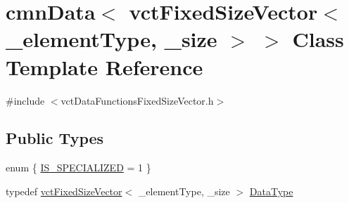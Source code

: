 \hypertarget{classcmn_data_3_01vct_fixed_size_vector_3_01__element_type_00_01__size_01_4_01_4}{}\section{cmn\+Data$<$ vct\+Fixed\+Size\+Vector$<$ \+\_\+element\+Type, \+\_\+size $>$ $>$ Class Template Reference}
\label{classcmn_data_3_01vct_fixed_size_vector_3_01__element_type_00_01__size_01_4_01_4}


{\ttfamily \#include $<$vct\+Data\+Functions\+Fixed\+Size\+Vector.\+h$>$}

\subsection*{Public Types}
\begin{DoxyCompactItemize}
\item 
enum \{ \hyperlink{classcmn_data_3_01vct_fixed_size_vector_3_01__element_type_00_01__size_01_4_01_4_a3cc02489a14a62b167209c4161b694a5aa91408e94959b83b507757e31a2b1958}{I\+S\+\_\+\+S\+P\+E\+C\+I\+A\+L\+I\+Z\+E\+D} = 1
 \}
\item 
typedef \hyperlink{classvct_fixed_size_vector}{vct\+Fixed\+Size\+Vector}$<$ \+\_\+element\+Type, \+\_\+size $>$ \hyperlink{classcmn_data_3_01vct_fixed_size_vector_3_01__element_type_00_01__size_01_4_01_4_ac8ff1c45828cc2add8111e02980f183a}{Data\+Type}
\end{DoxyCompactItemize}
